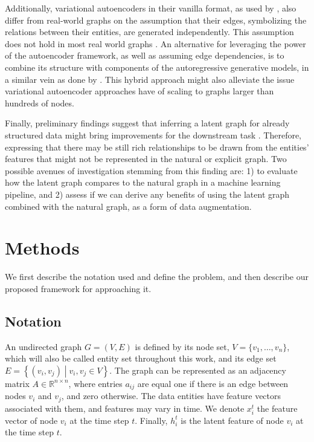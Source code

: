 \documentclass[12pt,a4paper]{article}
\begin{document}
	Additionally, variational autoencoders in their vanilla format, as used by \textcite{KipfNRI2018}, also differ from real-world graphs on the assumption that their edges, symbolizing the relations between their entities, are generated independently. This assumption does not hold in most real world graphs \citep{Hamilton2020}. An alternative for leveraging the power of the autoencoder framework, as well as assuming edge dependencies, is to combine its structure with components of the autoregressive generative models, in a similar vein as done by \textcite{Jin2018}. This hybrid approach might also alleviate the issue variational autoencoder approaches have of scaling to graphs larger than hundreds of nodes.
	
	Finally, preliminary findings suggest that inferring a latent graph for already structured data might bring improvements for the downstream task \citep{KipfNRI2018}. Therefore, expressing that there may be still rich relationships to be drawn from the entities’ features that might not be represented in the natural or explicit graph. Two possible avenues of investigation stemming from this finding are: 1) to evaluate how the latent graph compares to the natural graph in a machine learning pipeline, and 2) assess if we can derive any benefits of using the latent graph combined with the natural graph, as a form of data augmentation.
	
	\section{Methods}
	\label{sec:Methods}
	
	We first describe the notation used and define the problem, and then describe our proposed framework for approaching it.
	
	\subsection{Notation}
	
	An undirected graph $G = (V,E)$ is defined by its node set, $V=\{v_1, \ldots, v_n \}$, which will also be called entity set throughout this work, and its edge set $E=\left\{(v_i, v_j)\middle|v_i, v_j \in V\right\}$. The graph can be represented as an adjacency matrix $A \in \mathbb{R}^{n \times n}$, where entries $a_{ij}$ are equal one if there is an edge between nodes $v_i$ and $v_j$, and zero otherwise. The data entities have feature vectors associated with them, and features may vary in time. We denote $x^t_i$ the feature vector of node $v_i$ at the time step $t$. Finally, $h^t_i$ is the latent feature of node $v_i$ at the time step $t$.
	
\end{document}
